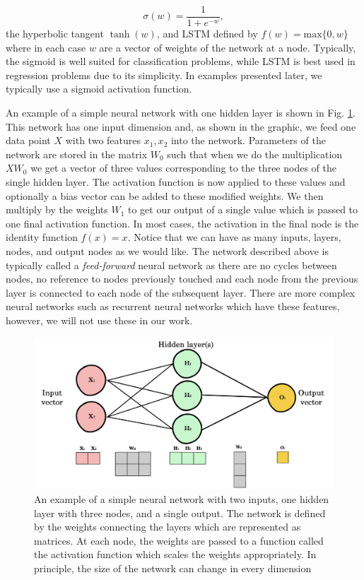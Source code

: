 \documentclass{CUP-JNL-DTM}%
\theoremstyle{definition}
\numberwithin{equation}{section}
\newcommand{\Define}{\emph}
\begin{document}
\begin{equation}
    \sigma(w) = \frac{1}{1 + e^{-w}},
\end{equation}
the hyperbolic tangent $\tanh(w)$, and LSTM defined by $f(w) = \textrm{max}\{0,w\}$ where in each case $w$ are a vector of weights of the network at a node. Typically, the sigmoid is well suited for classification problems, while LSTM is best used in regression problems due to its simplicity. In examples presented later, we typically use a sigmoid activation function. 

An example of a simple neural network with one hidden layer is shown in Fig. \ref{fig:NNexample}. This network has one input dimension and, as shown in the graphic, we feed one data point $X$ with two features $x_1, x_2$ into the network. Parameters of the network are stored in the matrix $W_0$ such that when we do the multiplication $X W_0$ we get a vector of three values corresponding to the three nodes of the single hidden layer. The activation function is now applied to these values and optionally a bias vector can be added to these modified weights. We then multiply by the weights $W_1$ to get our output of a single value which is passed to one final activation function. In most cases, the activation in the final node is the identity function $f(x) = x$. Notice that we can have as many inputs, layers, nodes, and output nodes as we would like. The network described above is typically called a \Define{feed-forward} neural network as there are no cycles between nodes, no reference to nodes previously touched and each node from the previous layer is connected to each node of the subsequent layer. There are more complex neural networks such as recurrent neural networks which have these features, however, we will not use these in our work.

\begin{figure}
\centering
\includegraphics[width=0.7\linewidth]{figures/NN_example.png}
\caption{An example of a simple neural network with two inputs, one hidden layer with three nodes, and a single output. The network is defined by the weights connecting the layers which are represented as matrices. At each node, the weights are passed to a function called the activation function which scales the weights appropriately. In principle, the size of the network can change in every dimension}
\label{fig:NNexample}
\end{figure}
\end{document}
